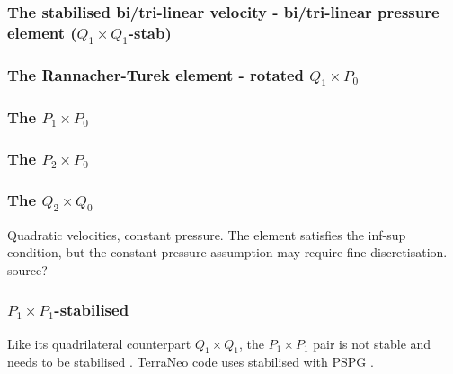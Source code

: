 \subsubsection{The stabilised bi/tri-linear velocity - bi/tri-linear pressure element ($Q_1\times Q_1$-stab)}
\label{ss:pairq1q1stab}



\subsubsection{The Rannacher-Turek element - rotated $Q_1\times P_0$} \label{ss:RTq1p0}


\subsubsection{The $P_1\times P_0$} \label{ss:p1p0}


\subsubsection{The $P_2\times P_0$} \label{ss:p2p0}


\subsubsection{The $Q_2\times Q_0$} \label{ss:pairq2q0}

Quadratic velocities, constant pressure. The element satisfies the inf-sup condition, 
but the constant pressure assumption may require fine discretisation.
source?


\subsubsection{$P_1\times P_1$-stabilised} \label{ss:P1P1stab}

Like its quadrilateral counterpart $Q_1\times Q_1$, the 
$P_1\times P_1$ pair is not stable and needs to be stabilised \cite{nosi98,tasu00}.
TerraNeo code uses stabilised with PSPG \cite{babd20}.

